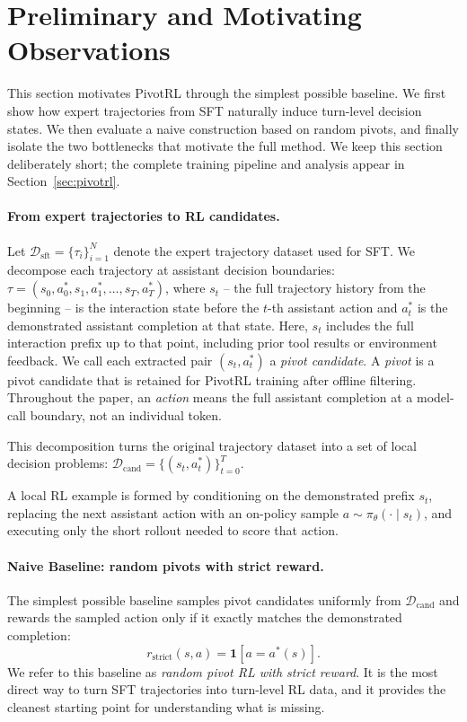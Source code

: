 \section{Preliminary and Motivating Observations}
\label{sec:prelim}

This section motivates PivotRL through the simplest possible baseline. We first show how expert trajectories from SFT naturally induce turn-level decision states. We then evaluate a naive construction based on random pivots, and finally isolate the two bottlenecks that motivate the full method. We keep this section deliberately short; the complete training pipeline and analysis appear in Section~\ref{sec:pivotrl}.

\paragraph{From expert trajectories to RL candidates.}
Let $\mathcal{D}_{\mathrm{sft}}=\{\tau_i\}_{i=1}^N$ denote the expert trajectory dataset used for SFT. We decompose each trajectory at assistant decision boundaries: $\tau = (s_0, a_0^*, s_1, a_1^*, \ldots, s_T, a_T^*)$, where $s_t$ -- the full trajectory history from the beginning -- is the interaction state before the $t$-th assistant action and $a_t^*$ is the demonstrated assistant completion at that state.
Here, $s_t$ includes the full interaction prefix up to that point, including prior tool results or environment feedback. We call each extracted pair $(s_t,a_t^*)$ a \emph{pivot candidate}. A \emph{pivot} is a pivot candidate that is retained for PivotRL training after offline filtering. Throughout the paper, an \emph{action} means the full assistant completion at a model-call boundary, not an individual token.

This decomposition turns the original trajectory dataset into a set of local decision problems: $\mathcal{D}_{\mathrm{cand}}=\{(s_t,a_t^*)\}_{t=0}^T.$

A local RL example is formed by conditioning on the demonstrated prefix $s_t$, replacing the next assistant action with an on-policy sample $a \sim \pi_\theta(\cdot \mid s_t)$, and executing only the short rollout needed to score that action.

\paragraph{Naive Baseline: random pivots with strict reward.}
The simplest possible baseline samples pivot candidates uniformly from $\mathcal{D}_{\mathrm{cand}}$ and rewards the sampled action only if it exactly matches the demonstrated completion:
\[
r_{\mathrm{strict}}(s,a)=\mathbf{1}[a=a^*(s)].
\]
We refer to this baseline as \emph{random pivot RL with strict reward}. It is the most direct way to turn SFT trajectories into turn-level RL data, and it provides the cleanest starting point for understanding what is missing.


